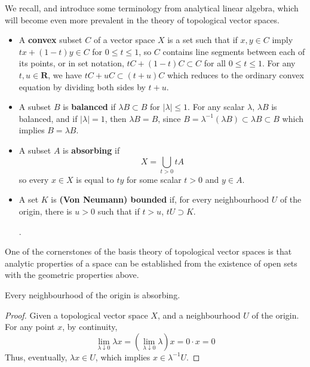 We recall, and introduce some terminology from analytical linear algebra, which will become even more prevalent in the theory of topological vector spaces.
%
\begin{itemize}
    \item A {\bf convex} subset $C$ of a vector space $X$ is a set such that if $x, y \in C$ imply $tx + (1 - t) y \in C$ for $0 \leq t \leq 1$, so $C$ contains line segments between each of its points, or in set notation, $tC + (1 - t)C \subset C$ for all $0 \leq t \leq 1$. For any $t, u \in \mathbf{R}$, we have $tC + uC \subset (t + u) C$ which reduces to the ordinary convex equation by dividing both sides by $t + u$.

    \item A subset $B$ is {\bf balanced} if $\lambda B \subset B$ for $|\lambda| \leq 1$. For any scalar $\lambda$, $\lambda B$ is balanced, and if $|\lambda| = 1$, then $\lambda B = B$, since $B = \lambda^{-1}(\lambda B) \subset \lambda B \subset B$
    which implies $B = \lambda B$.

    \item A subset $A$ is {\bf absorbing} if
    \[ X = \bigcup_{t > 0} tA \]
    so every $x \in X$ is equal to $ty$ for some scalar $t > 0$ and $y \in A$.

    \item A set $K$ is {\bf (Von Neumann) bounded} if, for every neighbourhood $U$ of the origin, there is $u > 0$ such that if $t > u$, $tU \supset K$.

.\end{itemize}
%
One of the cornerstones of the basis theory of topological vector spaces is that analytic properties of a space can be established from the existence of open sets with the geometric properties above.

\begin{theorem}
    Every neighbourhood of the origin is absorbing.
\end{theorem}
\begin{proof}
    Given a topological vector space $X$, and a neighbourhood $U$ of the origin. For any point $x$, by continuity,
    \[ \lim_{\lambda \downarrow 0} \lambda x = \left( \lim_{\lambda \downarrow 0} \lambda \right) x = 0 \cdot x = 0 \]
    Thus, eventually, $\lambda x \in U$, which implies $x \in \lambda^{-1} U$.
\end{proof}

